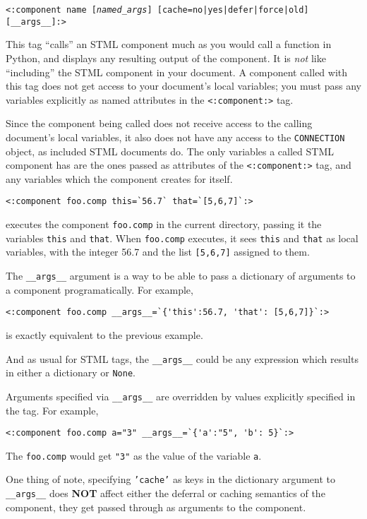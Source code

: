 \documentclass{manual}
\begin{document}
\texttt{<:component name [\emph{named_args}] [cache=no|yes|defer|force|old] [__args__]:>}

This tag ``calls'' an STML component much as you would call a function
in Python, and displays any resulting output of the component. It is
\emph{not} like ``including'' the STML component in your document. A
component called with this tag does not get access to your document's
local variables; you must pass any variables explicitly as named
attributes in the \texttt{<:component:>} tag.

Since the component being called does not receive access to the
calling document's local variables, it also does not have any access
to the \texttt{CONNECTION} object, as included STML documents do. The
only variables a called STML component has are the ones passed as
attributes of the \texttt{<:component:>} tag, and any variables which
the component creates for itself.

\begin{verbatim}<:component foo.comp this=`56.7` that=`[5,6,7]`:>
\end{verbatim}

executes the component \texttt{foo.comp} in the current directory,
passing it the variables \texttt{this} and \texttt{that}.  When
\texttt{foo.comp} executes, it sees \texttt{this} and \texttt{that} as
local variables, with the integer 56.7 and the list \texttt{[5,6,7]}
assigned to them.

The \texttt{__args__} argument is a way to be able to pass a
dictionary of arguments to a component programatically.  For example,
\begin{verbatim}
<:component foo.comp __args__=`{'this':56.7, 'that': [5,6,7]}`:>
\end{verbatim}
is exactly equivalent to the previous example. 

And as usual for STML tags, the \texttt{__args__} could be any
expression which results in either a dictionary or \texttt{None}.

Arguments specified via \texttt{__args__} are overridden by values
explicitly specified in the tag.  For example,
\begin{verbatim}
<:component foo.comp a="3" __args__=`{'a':"5", 'b': 5}`:>
\end{verbatim}
The \texttt{foo.comp} would get \texttt{"3"} as the value of the
variable \texttt{a}.

One thing of note, specifying \texttt{'cache'} as keys in the
dictionary argument to \texttt{__args__} does \textbf{NOT} affect
either the deferral or caching semantics of the component, they get
passed through as arguments to the component.
\end{document}
